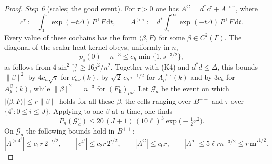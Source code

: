 \documentclass[11pt,letterpaper,reqno]{amsart}
\theoremstyle{definition}
\begin{document}
\begin{proof}
\emph{Step 6} (scales; the good event).
For $\tau>0$ one has $A^{\mathrm C}=d^*c^\tau+A^{>\tau}$, where
\begin{equation*}
c^\tau:=\int_0^\tau\exp(-t\Delta)\,P^\perp F\,\mathrm dt,\qquad A^{>\tau}:=d^*\int_\tau^\infty\exp(-t\Delta)\,P^\perp F\,\mathrm dt.
\end{equation*}
Every value of these cochains has the form $\langle\beta,F\rangle$ for some $\beta\in C^2(\Gamma)$.
The diagonal of the scalar heat kernel obeys, uniformly in $n$,
\begin{equation*}
p_s(0)-n^{-3}\le c_h\min\{1,s^{-3/2}\},
\end{equation*}
as follows from $4\sin^2\frac{\pi j}{n}\ge16j^2/n^2$.
Together with (K4) and $d^*d\le\Delta$, this bounds $\|\beta\|^2$ by $4c_h\sqrt\tau$ for $c^\tau_{\mu\nu}(k)$, by $\sqrt2\,c_h\tau^{-1/2}$ for $A^{>\tau}_\mu(k)$ and by $3c_h$ for $A^{\mathrm C}_\mu(k)$, while $\|\beta\|^2=n^{-3}$ for $(F_{\mathrm h})_{\mu\nu}$.
Let $\mathcal G_a$ be the event on which $|\langle\beta,F\rangle|\le r\|\beta\|$ holds for all these $\beta$, the cells ranging over $B^{++}$ and $\tau$ over $\{4^i:0\le i\le J\}$.
Applying \cite[Theorem~6.27\,(c)]{QEDII} to one $\beta$ at a time, one finds
\begin{equation*}
P_n(\mathcal G_a^c)\le20\,(J+1)\,(10\ell)^3\exp\bigl(-\tfrac12r^2\bigr).
\end{equation*}
On $\mathcal G_a$ the following bounds hold in $B^{++}$:
\begin{equation*}
|A^{>4^i}|\le c_1r\,2^{-i/2},\qquad|c^{4^i}|\le c_2r\,2^{i/2},\qquad|A^{\mathrm C}|\le c_0r,\qquad|A^{\mathrm h}|\le5\ell rn^{-3/2}\le r\,\mathbf m'^{1/2}.
\end{equation*}


\end{proof}
\end{document}
